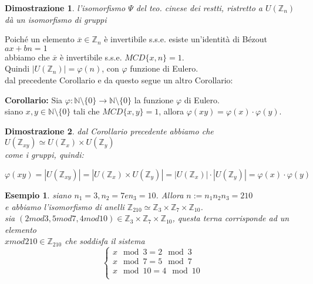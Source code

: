 \documentclass[a4paper,12pt]{article}
\theoremstyle{def}
\theoremstyle{prop}
\theoremstyle{esempio}
\newtheorem*{example}{Esempio}
\theoremstyle{dimostrazione}
\newtheorem*{dimostrazione}{Dimostrazione}
\theoremstyle{teo}
\theoremstyle{osservazione}
\begin{document}
\begin{dimostrazione}
	l'isomorfismo \(\Psi\) del teo. cinese dei restti, ristretto a \(U(\mathbb{Z}_n)\) dà un isomorfismo di gruppi\\
\end{dimostrazione}

Poiché un elemento \(\overline{x} \in \mathbb{Z}_n\) è invertibile s.s.e. esiste un'identità di Bézout \(ax + bn = 1\)\\
abbiamo che \(\overline{x}\) è invertibile s.s.e. \(MCD\{x,n\} = 1\).\\
Quindi \(|U(\mathbb{Z}_n)| = \varphi(n)\), con \(\varphi\) funzione di Eulero.\\

dal precedente Corollario e da questo segue un altro Corollario:

\textbf{Corollario:} Sia \(\varphi : \mathbb{N} \setminus \{0\} \rightarrow \mathbb{N} \setminus \{0\}\) la funzione \(\varphi\) di Eulero.\\
siano \(x,y \in \mathbb{N} \setminus \{0\}\) tali che \(MCD\{x,y\} = 1\), allora \(\varphi(xy) = \varphi(x) \cdot \varphi(y)\).\\

\begin{dimostrazione}
	dal Corollario precedente abbiamo che \(U(\mathbb{Z}_{xy}) \simeq U(\mathbb{Z}_x) \times U(\mathbb{Z}_y)\)\\
	come i gruppi, quindi:
	\begin{center}
		\(\varphi(xy) = |U(\mathbb{Z}_{xy})| = |U(\mathbb{Z}_x) \times U(\mathbb{Z}_y)| = |U(\mathbb{Z}_x)| \cdot |U(\mathbb{Z}_y)| = \varphi(x) \cdot \varphi(y)\)
	\end{center}
\end{dimostrazione}

\newpage

\begin{example}
	siano \(n_1 = 3, n_2 = 7 e n_3 = 10\). Allora \(n := n_1 n_2 n_3 = 210\)\\
	e abbiamo l'isomorfismo di anelli \(\mathbb{Z}_{210} \simeq \mathbb{Z}_3 \times \mathbb{Z}_7 \times \mathbb{Z}_{10}\).\\
	sia \((2 mod 3, 5 mod 7, 4 mod 10) \in \mathbb{Z}_3 \times \mathbb{Z}_7 \times \mathbb{Z}_{10}\), questa terna corrisponde ad un elemento\\
	\(x mod 210 \in \mathbb{Z}_{210}\) che soddisfa il sistema
	\[
		\begin{cases}
			x\mod 3 = 2\mod 3   \\
			x\mod 7 = 5\mod 7   \\
			x\mod 10 = 4\mod 10 \\
		\end{cases}
	\]
\end{example}
\end{document}
